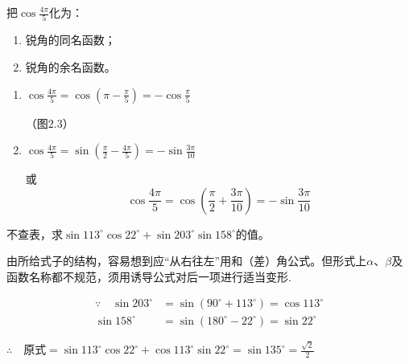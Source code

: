 \noindent
\begin{minipage}{.55\textwidth}
\begin{example}
把$\cos\frac{4\pi}{5}$化为：
\begin{enumerate}[(1)]
    \item 锐角的同名函数；
    \item 锐角的余名函数。
\end{enumerate}
\end{example}

\begin{solution}
\begin{enumerate}[(1)]
    \item $\cos\frac{4\pi}{5}=\cos\left(\pi-\frac{\pi}{5}\right)=-\cos\frac{\pi}{5}$
    
    （图2.3）
    \item $\cos\frac{4\pi}{5}=\sin\left(\frac{\pi}{2}-\frac{4\pi}{5}\right)=-\sin\frac{3\pi}{10}$
    
或
\[\cos\frac{4\pi}{5}=\cos\left(\frac{\pi}{2}+\frac{3\pi}{10}\right)=-\sin\frac{3\pi}{10}\]    
\end{enumerate}
\end{solution}    
\end{minipage}\hfill
\begin{minipage}{.35\textwidth}
\centering
{}
\end{minipage}

\begin{example}
    不查表，求$\sin113^{\circ}\cos22^{\circ}+\sin203^{\circ}\sin158^{\circ}$的值。
\end{example}

\begin{analyze}
由所给式子的结构，容易想到应“从右往左”用和（差）角公式。但形式上$\alpha$、$\beta$及函数名称都不规范，须用诱导公式对后一项进行适当变形.
\end{analyze}

\begin{solution}
\[\begin{split}
\because\quad \sin203^{\circ}&=\sin(90^{\circ}+113^{\circ})=\cos113^{\circ}\\
\sin 158^{\circ}&=\sin(180^{\circ}-22^{\circ})=\sin 22^{\circ}
\end{split}\]

$\therefore\quad \text{原式}=\sin113^{\circ}\cos22^{\circ}+\cos113^{\circ}\sin22^{\circ}=\sin135^{\circ}=\frac{\sqrt{2}}{2}$
\end{solution}


